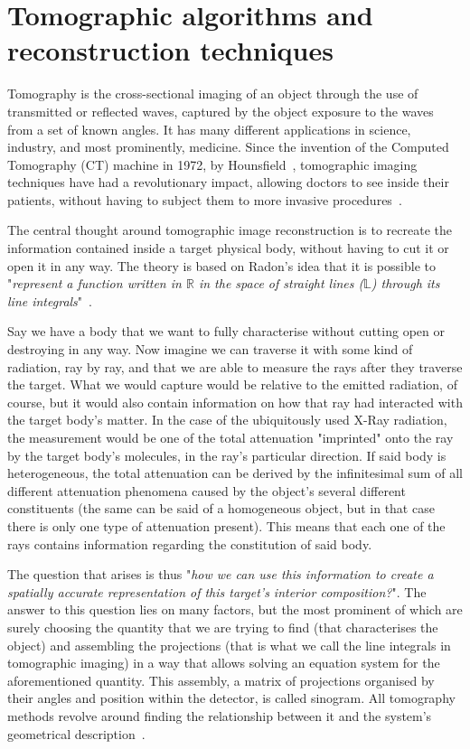 \section{Tomographic algorithms and reconstruction techniques}%
\label{sec:tomographic_algorithms_and_reconstruction_techniques}

Tomography is the cross-sectional imaging of an object through the use
of transmitted or reflected waves, captured by the object exposure to
the waves from a set of known angles. It has many different applications
in science, industry, and most prominently, medicine. Since the
invention of the Computed Tomography (\gls{CT}) machine in 1972, by
Hounsfield~\cite{Gunderman2006}, tomographic imaging techniques have had
a revolutionary impact, allowing doctors to see inside their patients,
without having to subject them to more invasive
procedures~\cite{Kak2001}.

The central thought around tomographic image reconstruction is to
recreate the information contained inside a target physical body,
without having to cut it or open it in any way. The theory is based on
Radon's idea that it is possible to "\emph{represent a function written
in $\mathbb{R}$ in the space of straight lines ($\mathbb{L}$) through
its line integrals}"~.

Say we have a body that we want to fully characterise without cutting
open or destroying in any way. Now imagine we can traverse it with some
kind of radiation, ray by ray, and that we are able to measure the rays
after they traverse the target. What we would capture would be relative
to the emitted radiation, of course, but it would also contain
information on how that ray had interacted with the target body's
matter. In the case of the ubiquitously used X-Ray radiation, the
measurement would be one of the total attenuation "imprinted" onto the
ray by the target body's molecules, in the ray's particular direction.
If said body is heterogeneous, the total attenuation can be derived by
the infinitesimal sum of all different attenuation phenomena caused by
the object's several different constituents (the same can be said of a
homogeneous object, but in that case there is only one type of
attenuation present). This means that each one of the rays contains
information regarding the constitution of said body.

The question that arises is thus "\emph{how we can use this information
to create a spatially accurate representation of this target's interior
composition?}". The answer to this question lies on many factors, but
the most prominent of which are surely choosing the quantity that we are
trying to find (that characterises the object) and assembling the
projections (that is what we call the line integrals in tomographic
imaging) in a way that allows solving an equation system for the
aforementioned quantity. This assembly, a matrix of projections
organised by their angles and position within the detector, is called
sinogram. All tomography methods revolve around finding the relationship
between it and the system's geometrical description~\cite{Bruyant2002,
Kak2001, Herman1973, Herman1995, Herman2009, Defrise2003}.

